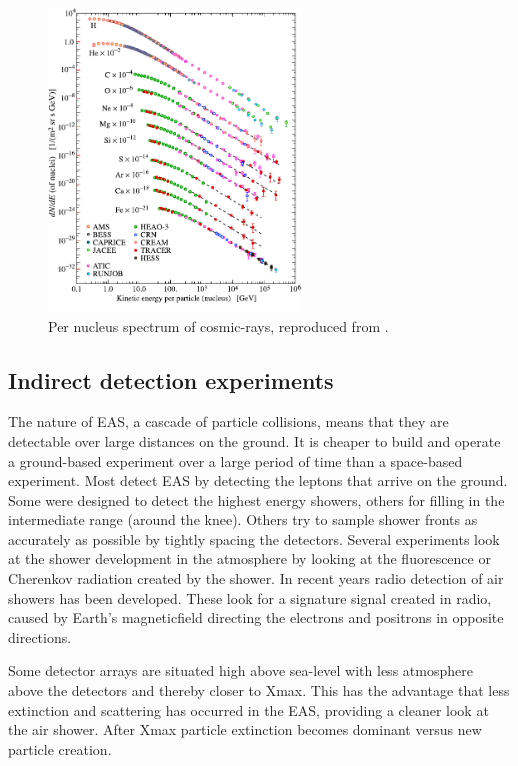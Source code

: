 \begin{figure}
    \centering
    \includegraphics[width=0.6\textwidth]
                    {plots/cosmic-rays/PDG_28_1_fluxes_per_nucleus}
    \caption{Per nucleus spectrum of cosmic-rays, reproduced from \cite{olive2014pdg}.}
    \label{fig:low_e_spectrum}
\end{figure}


\subsection{Indirect detection experiments}

The nature of EAS, a cascade of particle collisions, means that they are detectable over large distances on the ground. It is cheaper to build and operate a ground-based experiment over a large period of time than a space-based experiment. Most detect EAS by detecting the leptons that arrive on the ground. Some were designed to detect the highest energy showers, others for filling in the intermediate range (around the knee). Others try to sample shower fronts as accurately as possible by tightly spacing the detectors. Several experiments look at the shower development in the atmosphere by looking at the fluorescence or Cherenkov radiation created by the shower. In recent years radio detection of air showers has been developed. These look for a signature signal created in radio, caused by Earth's magneticfield directing the electrons and positrons in opposite directions.

Some detector arrays are situated high above sea-level with less atmosphere above the detectors and thereby closer to Xmax. This has the advantage that less extinction and scattering has occurred in the EAS, providing a cleaner look at the air shower. After Xmax particle extinction becomes dominant versus new particle creation.

